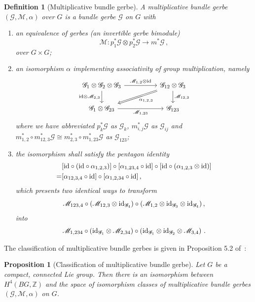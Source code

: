 \documentclass[a4paper,11pt]{article}
\newtheorem{prop}[lemma]{Proposition}
\newtheorem{defn}[lemma]{Definition}
\newcommand{\be}{\begin{equation}}
\newcommand{\ee}{\end{equation}}
\newcommand{\ba}{\begin{aligned}}
\newcommand{\ea}{\end{aligned}}
\begin{document}
\begin{defn}[Multiplicative bundle gerbe]
A multiplicative bundle gerbe $(\mathscr{G},\mathscr{M},\alpha)$ over $G$ is a bundle gerbe $\mathscr{G}$ on $G$ with
\begin{enumerate}
    \item an equivalence of gerbes (an invertible \emph{gerbe bimodule})
    \be\label{eq:scrm} \mathscr{M}: p_1^* \mathscr{G} \otimes  p_2^* \mathscr{G}  \to m^*\mathscr{G}\,, \ee
    over $G\times G$;
    \item an isomorphism $\alpha$ implementing associativity of group multiplication, namely
    \be
    \begin{tikzcd}
\mathscr{G}_1\otimes \mathscr{G}_2\otimes \mathscr{G}_3 \arrow[d, "{{\rm id }\otimes \mathscr{M}_{2,3}}"'] \arrow[rr, "{\mathscr{M}_{1,2}\otimes {\rm id}}"] &  & \mathscr{G}_{12}\otimes \mathscr{G}_3 \arrow[d, "{\mathscr{M}_{12,3}}"] \arrow[lld, "{\alpha_{1,2,3}}", Rightarrow] \\
\mathscr{G}_{1}\otimes \mathscr{G}_{23} \arrow[rr, "{\mathscr{M}_{1,23}}"']                                                                          &  & \mathscr{G}_{123}                                                                                                      
\end{tikzcd}\ee
where we have abbreviated $p_{k}^*\mathscr{G}$ as $\mathscr{G}_k$, $m_{i,j}^*\mathscr{G}$ as $\mathscr{G}_{ij}$ and $m^*_{1,2}\circ m_{12,3}^*\mathscr{G} \cong  m_{2,3}^*\circ m_{1,23}^*\mathscr{G}$ as $\mathscr{G}_{123}$;
    \item the isomorphism shall satisfy the pentagon identity
    \be \ba &[{\rm id} \circ ({\rm id} \circ \alpha_{1,2,3})] \circ [ \alpha_{1,23,4}\circ {\rm id} ]\circ[{\rm id}\circ (\alpha_{1,2,3}\otimes {\rm id})] \\ = &[\alpha_{12,3,4}\circ {\rm id}] \circ [\alpha_{1,2,34}\circ{\rm id} ]\,, \ea\ee
    which presents two identical ways to transform
    \be
    \mathscr{M}_{123,4} \circ (\mathscr{M}_{12,3}\otimes {\rm id}_{\mathscr{G}_4}) \circ (\mathscr{M}_{1,2}\otimes {\rm id}_{\mathscr{G}_3}\otimes {\rm id}_{\mathscr{G}_4} )\,,
    \ee
    into
    \be
    \mathscr{M}_{1,234} \circ ({\rm id}_{\mathscr{G}_1}\otimes \mathscr{M}_{2,34}) \circ ({\rm id}_{\mathscr{G}_1}\otimes {\rm id}_{\mathscr{G}_2} \otimes \mathscr{M}_{3,4} ) \ .
    \ee
\end{enumerate}
\end{defn}
The classification of multiplicative bundle gerbes is given in Proposition 5.2 of~\cite{Carey:2004xt}:
\begin{prop}[Classification of multiplicative bundle gerbe]
    Let $G$ be a compact, connected Lie group. Then there is an isomorphism between $H^4(B G , \mathbb{Z})$ and the space of isomorphism classes of multiplicative bundle gerbes $(\mathcal{G},\mathscr{M},\alpha)$ on $G$.
\end{prop}
\end{document}
